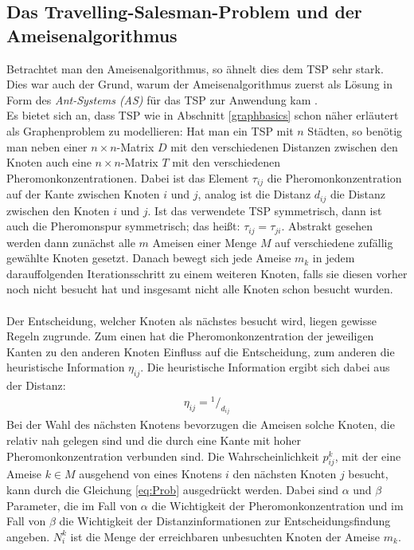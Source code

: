 \documentclass[doktyp=barbeit, sprache=german]{TUBAFarbeiten}
\newcommand*\rfrac[2]{{}^{#1}\!/_{#2}}
\begin{document}
\subsection{Das Travelling-Salesman-Problem und der Ameisenalgorithmus}
Betrachtet man den Ameisenalgorithmus, so ähnelt dies dem TSP sehr stark. Dies war auch der Grund, warum der Ameisenalgorithmus zuerst als Lösung in Form des \textit{Ant-Systems (AS)} für das TSP zur Anwendung kam \cite{MaxMin}.
\\Es bietet sich an, dass TSP wie in Abschnitt \ref{graphbasics} schon näher erläutert als Graphenproblem zu modellieren:
Hat man ein TSP mit $n$ Städten, so benötig man neben einer $n\times n$-Matrix $D$ mit den verschiedenen Distanzen zwischen den Knoten auch eine $n\times n$-Matrix $T$ mit den verschiedenen Pheromonkonzentrationen. Dabei ist das Element $\tau_{ij}$ die Pheromonkonzentration auf der Kante zwischen Knoten $i$ und $j$, analog ist die Distanz $d_{ij}$ die Distanz zwischen den Knoten $i$ und $j$. Ist das verwendete TSP symmetrisch, dann ist auch die Pheromonspur symmetrisch; das heißt: $\tau_{ij} = \tau_{ji}$.
Abstrakt gesehen werden dann zunächst alle $m$ Ameisen einer Menge $M$ auf verschiedene zufällig gewählte Knoten gesetzt. Danach bewegt sich jede Ameise $m_k$ in jedem darauffolgenden Iterationsschritt zu einem weiteren Knoten, falls sie diesen vorher noch nicht besucht hat und insgesamt nicht alle Knoten schon besucht wurden. 
\\\\Der Entscheidung, welcher Knoten als nächstes besucht wird, liegen gewisse Regeln zugrunde. Zum einen hat die Pheromonkonzentration der jeweiligen Kanten zu den anderen Knoten Einfluss auf die Entscheidung, zum anderen die heuristische Information $\eta_{ij}$. Die heuristische Information ergibt sich dabei aus der Distanz:
\begin{align}
\label{eq:Heuristic}
\eta_{ij} = \rfrac{1}{d_{ij}}
\end{align}
Bei der Wahl des nächsten Knotens bevorzugen die Ameisen solche Knoten, die relativ nah gelegen sind und die durch eine Kante mit hoher Pheromonkonzentration verbunden sind.
Die Wahrscheinlichkeit $p^k_{ij}$, mit der eine Ameise $k \in M$ ausgehend von eines Knotens $i$ den nächsten Knoten $j$ besucht, kann durch die Gleichung \ref{eq:Prob} ausgedrückt werden.
Dabei sind $\alpha$ und $\beta$ Parameter, die im Fall von $\alpha$ die Wichtigkeit der Pheromonkonzentration und im Fall von $\beta$ die Wichtigkeit der Distanzinformationen zur Entscheidungsfindung angeben. $N^k_i$ ist die Menge der erreichbaren unbesuchten Knoten der Ameise $m_k$.
\end{document}
